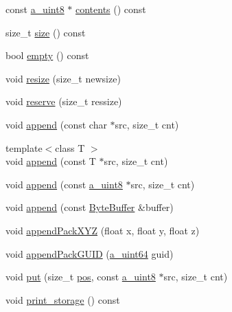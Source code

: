 \begin{DoxyCompactItemize}
const \hyperlink{_common_defines_8h_afbe6c09973474a1f78f870f39073398f}{a\+\_\+uint8} $\ast$ \hyperlink{class_agmd_network_1_1_byte_buffer_a193ec5f96f93c117a002e907ff68d488}{contents} () const 
\item 
size\+\_\+t \hyperlink{class_agmd_network_1_1_byte_buffer_a098026cc32635b486d7df2cfca21c192}{size} () const 
\item 
bool \hyperlink{class_agmd_network_1_1_byte_buffer_a488ec8af3ca929c630dd32861e5d4a0e}{empty} () const 
\item 
void \hyperlink{class_agmd_network_1_1_byte_buffer_a37880adf7904c78ec0dad7ba64ed138a}{resize} (size\+\_\+t newsize)
\item 
void \hyperlink{class_agmd_network_1_1_byte_buffer_a5e37218fdf95855c94a6fc078eb04138}{reserve} (size\+\_\+t ressize)
\item 
void \hyperlink{class_agmd_network_1_1_byte_buffer_ae2d656c131f1102ad830efe9673616bc}{append} (const char $\ast$src, size\+\_\+t cnt)
\item 
{\footnotesize template$<$class T $>$ }\\void \hyperlink{class_agmd_network_1_1_byte_buffer_a6663f933d5c3f78f05daede33820a422}{append} (const T $\ast$src, size\+\_\+t cnt)
\item 
void \hyperlink{class_agmd_network_1_1_byte_buffer_a63b3ad581be2d3416df03710584890e4}{append} (const \hyperlink{_common_defines_8h_afbe6c09973474a1f78f870f39073398f}{a\+\_\+uint8} $\ast$src, size\+\_\+t cnt)
\item 
void \hyperlink{class_agmd_network_1_1_byte_buffer_a12e7c740a5c5b9376b59f22d9dd84d22}{append} (const \hyperlink{class_agmd_network_1_1_byte_buffer}{Byte\+Buffer} \&buffer)
\item 
void \hyperlink{class_agmd_network_1_1_byte_buffer_a72e3ae23cdd38aeef8828961cb4065b3}{append\+Pack\+X\+Y\+Z} (float x, float y, float z)
\item 
void \hyperlink{class_agmd_network_1_1_byte_buffer_a8e22884ecb579bcc4631d144b546bca0}{append\+Pack\+G\+U\+I\+D} (\hyperlink{_common_defines_8h_a6c5192ec3c55d6e5b13d2dbaa082bdea}{a\+\_\+uint64} guid)
\item 
void \hyperlink{class_agmd_network_1_1_byte_buffer_ab05873768789da3e3421e2317bd27c80}{put} (size\+\_\+t \hyperlink{_examples_2_planet_2_app_8cpp_aa8a1c0491559faca4ebd0881575ae7f0}{pos}, const \hyperlink{_common_defines_8h_afbe6c09973474a1f78f870f39073398f}{a\+\_\+uint8} $\ast$src, size\+\_\+t cnt)
\item 
void \hyperlink{class_agmd_network_1_1_byte_buffer_a9dd8a0b37247ae12cd6c1375bad55266}{print\+\_\+storage} () const 

\end{DoxyCompactItemize}
